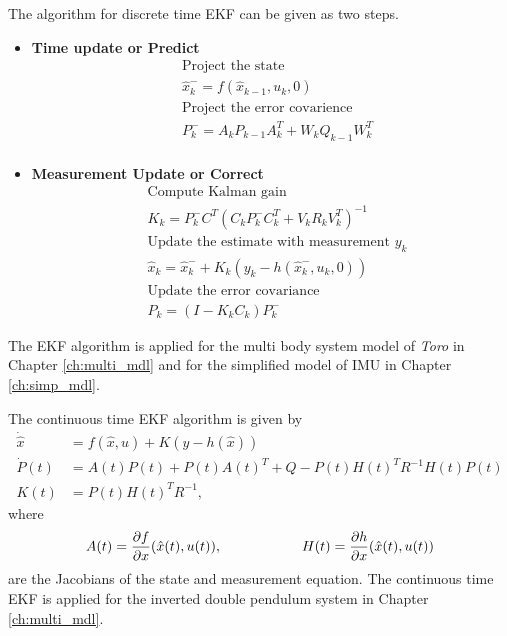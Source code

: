 The algorithm for discrete time EKF can be given as two steps.
\begin{itemize}
    \item \textbf{Time update or Predict}
\begin{equation}
\label{eq:ekf_predict}
\begin{aligned}
&\text{Project the state}\\
&\hat{x}_k^- = f(\hat{x}_{k-1},u_k,0)\\
&\text{Project the error covarience}\\
&P_k^- = A_kP_{k-1}A_k^T + W_kQ_{k-1}W_k^T\\
\end{aligned}
\end{equation}
\item \textbf{Measurement Update or Correct}\\
\begin{equation}
\label{eq:ekf_correct}
\begin{split}
&\text{Compute Kalman gain}\\
&K_k = P_k^-C^T(C_kP_k^-C_k^T + V_kR_kV_k^T)^{-1}\\
&\text{Update the estimate with measurement }y_k\\
&\hat{x}_k = \hat{x}_k^- + K_k(y_k-h(\hat{x}_k^-,u_k,0))\\
&\text{Update the error covariance} \\
&P_k = (I- K_kC_k)P_k^-
\end{split}
\end{equation}
\end{itemize}

The EKF algorithm is applied for the multi body system model of \emph{Toro} in Chapter \ref{ch:multi_mdl} and for the simplified model of IMU in Chapter \ref{ch:simp_mdl}.

The continuous time EKF algorithm is given by \citep{gel74}
\begin{equation}
    \label{eq:ekf_con}
    \begin{split}
        \dot {\hat x} &= f(\hat x,u) + K ( y-h(\hat x))\\
        \dot P(t) &= A(t)P(t) + P(t)A(t)^T + Q - P(t)H(t)^TR^{-1}H(t)P(t)\\
        K(t) &= P(t)H(t)^TR^{-1},
    \end{split}
\end{equation}
where $$A(t) = \frac{\partial {f}}{\partial {x}}(\hat x(t), u(t)), \hspace{2cm} H(t) = \frac{\partial {h}}{\partial {x}} (\hat x(t), u(t))$$ are the Jacobians of the state and measurement equation. The continuous time EKF is applied for the inverted double pendulum system in Chapter \ref{ch:multi_mdl}.

